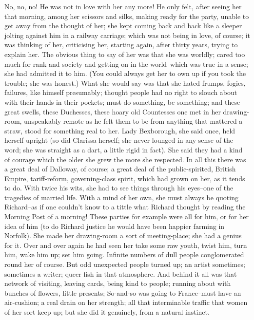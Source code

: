 \documentclass[lang=cn,10pt]{elegantbook}
\begin{document}
No, no, no!  He was not in love with her any more!  He only felt,
after seeing her that morning, among her scissors and silks, making
ready for the party, unable to get away from the thought of her;
she kept coming back and back like a sleeper jolting against him in
a railway carriage; which was not being in love, of course; it was
thinking of her, criticising her, starting again, after thirty
years, trying to explain her.  The obvious thing to say of her was
that she was worldly; cared too much for rank and society and
getting on in the world--which was true in a sense; she had
admitted it to him.  (You could always get her to own up if you
took the trouble; she was honest.)  What she would say was that she
hated frumps, fogies, failures, like himself presumably; thought
people had no right to slouch about with their hands in their
pockets; must do something, be something; and these great swells,
these Duchesses, these hoary old Countesses one met in her drawing-
room, unspeakably remote as he felt them to be from anything that
mattered a straw, stood for something real to her.  Lady
Bexborough, she said once, held herself upright (so did Clarissa
herself; she never lounged in any sense of the word; she was
straight as a dart, a little rigid in fact).  She said they had a
kind of courage which the older she grew the more she respected.
In all this there was a great deal of Dalloway, of course; a great
deal of the public-spirited, British Empire, tariff-reform,
governing-class spirit, which had grown on her, as it tends to do.
With twice his wits, she had to see things through his eyes--one of
the tragedies of married life.  With a mind of her own, she must
always be quoting Richard--as if one couldn't know to a tittle what
Richard thought by reading the Morning Post of a morning!  These
parties for example were all for him, or for her idea of him (to do
Richard justice he would have been happier farming in Norfolk).
She made her drawing-room a sort of meeting-place; she had a genius
for it.  Over and over again he had seen her take some raw youth,
twist him, turn him, wake him up; set him going.  Infinite numbers
of dull people conglomerated round her of course.  But odd
unexpected people turned up; an artist sometimes; sometimes a
writer; queer fish in that atmosphere.  And behind it all was that
network of visiting, leaving cards, being kind to people; running
about with bunches of flowers, little presents; So-and-so was going
to France--must have an air-cushion; a real drain on her strength;
all that interminable traffic that women of her sort keep up; but
she did it genuinely, from a natural instinct.
\end{document}
